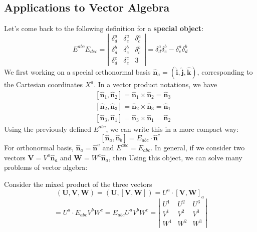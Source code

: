 \subsection{Applications to Vector Algebra}
Let's come back to the following definition for a \textbf{special object}:
$$
E^{a b c} E_{d e c}=\left|\begin{array}{ccc}
{\delta_{d}^{a}} & {\delta_{e}^{a}} & {\delta_{c}^{a}} \\
{\delta_{d}^{b}} & {\delta_{e}^{b}} & {\delta_{c}^{b}} \\
{\delta_{d}^{c}} & {\delta_{e}^{c}} & {3}
\end{array}\right|=\delta_{d}^{a} \delta_{e}^{b}-\delta_{e}^{a} \delta_{d}^{b}
$$
We first working on a special orthonormal basis $\hat{\mathbf{n}}_{a}=(\hat{\mathbf{i}}, \hat{\mathbf{j}}, \hat{\mathbf{k}})$, corresponding to the Cartesian coordinates $X^a$. In a vector product notations, we have
$$
\begin{aligned}
&\left[\hat{\mathbf{n}}_{1}, \hat{\mathbf{n}}_{2}\right]=\hat{\mathbf{n}}_{1} \times \hat{\mathbf{n}}_{2}=\hat{\mathbf{n}}_{3}\\
&\left[\hat{\mathbf{n}}_{2}, \hat{\mathbf{n}}_{3}\right]=\hat{\mathbf{n}}_{2} \times \hat{\mathbf{n}}_{3}=\hat{\mathbf{n}}_{1}\\
&\left[\hat{\mathbf{n}}_{3}, \hat{\mathbf{n}}_{1}\right]=\hat{\mathbf{n}}_{3} \times \hat{\mathbf{n}}_{1}=\hat{\mathbf{n}}_{2}
\end{aligned}
$$
Using the previously defined $E^{abc}$, we can write this in a more compact way:
\begin{equation}
\left[\hat{\mathbf{n}}_{a}, \hat{\mathbf{n}}_{b}\right]=E_{a b c} \cdot \hat{\mathbf{n}}^{c}
\end{equation}
For orthonormal basis, $\hat{\mathbf{n}}_{a}=\hat{\mathbf{n}}^{a}$ and $E^{a b c}=E_{a b c}$. In general, if we consider two vectors $\mathbf{V}=V^{a} \hat{\mathbf{n}}_{a}$ and $\mathbf{W}=W^{a} \hat{\mathbf{n}}_{a}$, then
Using this object, we can solve many problems of vector algebra:
\begin{example}
Consider the mixed product of the three vectors
$$
(\mathbf{U}, \mathbf{V}, \mathbf{W})=(\mathbf{U},[\mathbf{V}, \mathbf{W}])=U^{a} \cdot[\mathbf{V}, \mathbf{W}]_{a}
$$
$$
=U^{a} \cdot E_{a b c} V^{b} W^{c}=E_{a b c} U^{a} V^{b} W^{c}=\left|\begin{array}{ccc}
{U^{1}} & {U^{2}} & {U^{3}} \\
{V^{1}} & {V^{2}} & {V^{3}} \\
{W^{1}} & {W^{2}} & {W^{3}}
\end{array}\right|
$$
\end{example}
